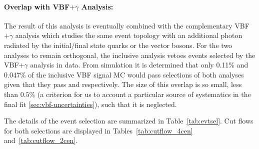 
\paragraph{Overlap with VBF$+\gamma$ Analysis:} The result of this analysis is eventually combined with the complementary VBF$+\gamma$ analysis which studies the same event topology with an additional photon radiated by the initial/final state quarks or the vector bosons. For the two analyses to remain orthogonal, the inclusive analysis vetoes events selected by the VBF$+\gamma$ analysis in data. From simulation it is determined that only 0.11\% and 0.047\% of the inclusive VBF signal MC would pass selections of both analyses given that they pass \twocentral and \fourcentral respectively. The size of this overlap is so small, less than $0.5\%$ (a criterion for us to account a particular source of systematics in the final fit \ref{sec:vbf-uncertainties}), such that it is neglected.  



The details of the event selection are summarized in Table~\ref{tab:evtsel}. Cut flows for both selections are displayed in Tables~\ref{tab:cutflow_4cen} and~\ref{tab:cutflow_2cen}.


